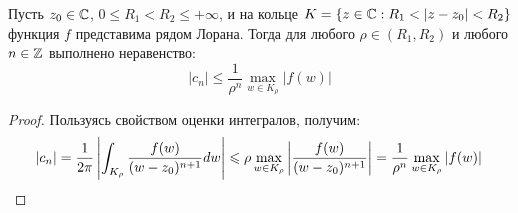 \begin{proposition}
	Пусть $z_0 \in \Cm$, $0 \le R_1 < R_2 \le +\infty$, и на кольце $K = \{z \in \Cm: R_1 < |z - z_0| < R_2\}$ функция $f$ представима рядом Лорана. Тогда для любого $\rho \in (R_1, R_2)$ и любого $n \in \Z$ выполнено неравенство:
	\[|c_n| \leqslant \frac{1}{\rho^n}\max\limits_{w \in K_{\rho}}\left|{f(w)}\right|\]
\end{proposition}

\begin{proof}
	Пользуясь свойством оценки интегралов, получим:
	\[|c_n| = \frac1{2\pi}\left|\int_{K_{\rho}} \frac{f(w)}{(w - z_0)^{n+1}}dw\right| \le \rho\max_{w \in K_\rho}\left|\frac{f(w)}{(w - z_0)^{n+1}}\right| = \frac1{\rho^n}\max_{w \in K_{\rho}}\left|{f(w)}\right| \qedhere\]
\end{proof}